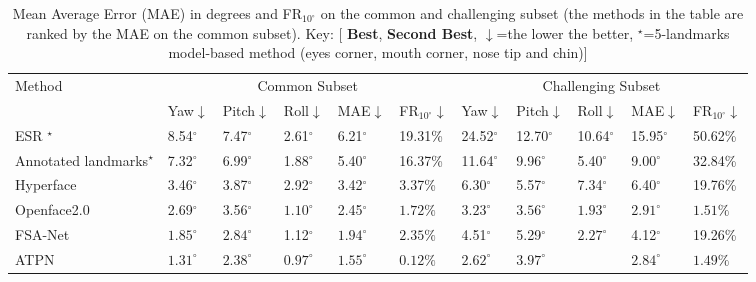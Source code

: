 \documentclass[3p,twocolumn, round, sort & compress]{elsarticle}
\begin{document}
\begin{table*}[t!]
	\centering
	\begin{tabular}{m{4.2cm}<{\centering}|m{0.6cm}<{\centering}m{0.7cm}<{\centering}m{0.6cm}<{\centering}m{0.7cm}<{\centering}m{1.0cm}<{\centering}|m{0.6cm}<{\centering}m{0.7cm}<{\centering}m{0.6cm}<{\centering}m{0.7cm}<{\centering}m{1.0cm}<{\centering}}
		\hline
		\multirow{2}{*}{Method} & \multicolumn{5}{c|}{Common Subset}   & \multicolumn{5}{c}{Challenging Subset}  \\ \cline{2-11} 
		& Yaw$\downarrow$  & Pitch$\downarrow$ & Roll$\downarrow$ & MAE$\downarrow$  & FR$_{10^\circ}$$\downarrow$   & Yaw$\downarrow$   & Pitch$\downarrow$ & Roll$\downarrow$  & MAE$\downarrow$   & FR$_{10^\circ}$$\downarrow$   \\ \hline
		ESR \citep{ESR}$^\star$ & 8.54$^\circ$ & 7.47$^\circ$  & 2.61$^\circ$ & 6.21$^\circ$ & 19.31\% & 24.52$^\circ$ & 12.70$^\circ$ & 10.64$^\circ$ & 15.95$^\circ$ & 50.62\% \\
		Annotated landmarks$^\star$   & 7.32$^\circ$ & 6.99$^\circ$  & 1.88$^\circ$ & 5.40$^\circ$ & 16.37\% & 11.64$^\circ$ & 9.96$^\circ$  & 5.40$^\circ$  & 9.00$^\circ$  & 32.84\% \\  
		Hyperface \citep{Hyperface} & 3.46$^\circ$ & 3.87$^\circ$  & 2.92$^\circ$ & 3.42$^\circ$ & 3.37\%  & 6.30$^\circ$  & 5.57$^\circ$  & 7.34$^\circ$  & 6.40$^\circ$  & 19.76\% \\
		Openface2.0 \citep{Openface} & 2.69$^\circ$ & 3.56$^\circ$  & {\color{blue} $\bm{1.10^\circ}$} & 2.45$^\circ$ & {\color{blue} $\bm{1.72\%}$}  & {\color{blue} $\bm{3.23^\circ}$}  &{\color{red}  $\bm{3.56^\circ}$}  & {\color{red} $\bm{1.93^\circ}$}  & {\color{blue} $\bm{2.91^\circ}$}  & {\color{blue} $\bm{1.51\%}$}  \\
		FSA-Net \citep{FSA-Net} & {\color{blue} $\bm{1.85^\circ}$} & {\color{blue} $\bm{2.84^\circ}$}  & 1.12$^\circ$ & {\color{blue} $\bm{1.94^\circ}$} & {\color{blue} $\bm{2.35\%}$}  & 4.51$^\circ$  & 5.29$^\circ$  & {\color{blue} $\bm{2.27^\circ}$}  & 4.12$^\circ$  & 19.26\% \\
		ATPN  & {\color{red} $\bm{1.31^\circ}$} & {\color{red} $\bm{2.38^\circ}$}  & {\color{red} $\bm{0.97^\circ}$} & {\color{red} $\bm{1.55^\circ}$} & {\color{red} $\bm{0.12\%}$}  & {\color{red} $\bm{2.62^\circ}$}  & {\color{blue} $\bm{3.97^\circ}$}  & {\color{red} \bm{$1.93^\circ$}}  & {\color{red} $\bm{2.84^\circ}$}  & {\color{red} $\bm{1.49\%}$}  \\ \hline
	\end{tabular}
	\caption{Mean Average Error (MAE) in degrees and FR$_{10^\circ}$ on the common and challenging subset (the methods in the table are ranked by the MAE on the common subset). Key: [{\color{red} \textbf{Best}}, {\color{blue} \textbf{Second Best}}, $\downarrow$=the lower the better, $^\star$=5-landmarks model-based method (eyes corner, mouth corner, nose tip and chin)]}
	\label{Tabal6}
\end{table*}
\end{document}
